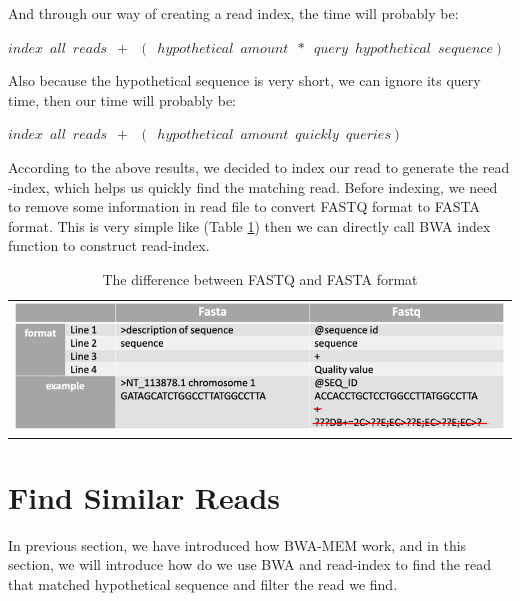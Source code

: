 \begin{flushleft}
And through our way of creating a read index, the time will probably be:
\end{flushleft}
\begin{center}
    $index\enspace all\enspace reads\enspace+\enspace(\enspace hypothetical\enspace amount\enspace*\enspace query\enspace hypothetical\enspace sequence)$
\end{center}  
\begin{flushleft}
Also because the hypothetical sequence is very short, we can ignore its query time, then our time will probably be:
\end{flushleft}
\begin{center}
    $index\enspace all\enspace reads\enspace+\enspace(\enspace hypothetical\enspace amount\enspace quickly\enspace queries)$
\end{center}  

According to the above results, we decided to index our read to generate the read -index, which helps us quickly find the matching read. Before indexing, we need to remove some information in read file to convert FASTQ format to FASTA format. This is very simple like (Table \ref{t3-1}) then we can directly call BWA index function to construct read-index.

\vspace{1cm}
\begin{table}[h]
    \centering
    \caption{The difference between FASTQ and FASTA format}
    \vspace{-0.5cm}
    \begin{tabular}{c}
        \includegraphics[width=1\textwidth]{body/image/t3-1.png}
    \end{tabular}
    \label{t3-1}
\end{table}

\section{Find Similar Reads}
In previous section, we have introduced how BWA-MEM work, and in this section, we will introduce how do we use BWA and read-index to find the read that matched hypothetical sequence and filter the read we find.

